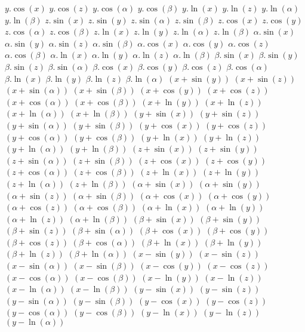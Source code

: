 $ y . \cos(x) $
$ y . \cos(z) $
$ y . \cos(\alpha) $
$ y . \cos(\beta) $
$ y . \ln(x) $
$ y . \ln(z) $
$ y . \ln(\alpha) $
$ y . \ln(\beta) $
$ z . \sin(x) $
$ z . \sin(y) $
$ z . \sin(\alpha) $
$ z . \sin(\beta) $
$ z . \cos(x) $
$ z . \cos(y) $
$ z . \cos(\alpha) $
$ z . \cos(\beta) $
$ z . \ln(x) $
$ z . \ln(y) $
$ z . \ln(\alpha) $
$ z . \ln(\beta) $
$ \alpha . \sin(x) $
$ \alpha . \sin(y) $
$ \alpha . \sin(z) $
$ \alpha . \sin(\beta) $
$ \alpha . \cos(x) $
$ \alpha . \cos(y) $
$ \alpha . \cos(z) $
$ \alpha . \cos(\beta) $
$ \alpha . \ln(x) $
$ \alpha . \ln(y) $
$ \alpha . \ln(z) $
$ \alpha . \ln(\beta) $
$ \beta . \sin(x) $
$ \beta . \sin(y) $
$ \beta . \sin(z) $
$ \beta . \sin(\alpha) $
$ \beta . \cos(x) $
$ \beta . \cos(y) $
$ \beta . \cos(z) $
$ \beta . \cos(\alpha) $
$ \beta . \ln(x) $
$ \beta . \ln(y) $
$ \beta . \ln(z) $
$ \beta . \ln(\alpha) $
$ (x + \sin(y)) $
$ (x + \sin(z)) $
$ (x + \sin(\alpha)) $
$ (x + \sin(\beta)) $
$ (x + \cos(y)) $
$ (x + \cos(z)) $
$ (x + \cos(\alpha)) $
$ (x + \cos(\beta)) $
$ (x + \ln(y)) $
$ (x + \ln(z)) $
$ (x + \ln(\alpha)) $
$ (x + \ln(\beta)) $
$ (y + \sin(x)) $
$ (y + \sin(z)) $
$ (y + \sin(\alpha)) $
$ (y + \sin(\beta)) $
$ (y + \cos(x)) $
$ (y + \cos(z)) $
$ (y + \cos(\alpha)) $
$ (y + \cos(\beta)) $
$ (y + \ln(x)) $
$ (y + \ln(z)) $
$ (y + \ln(\alpha)) $
$ (y + \ln(\beta)) $
$ (z + \sin(x)) $
$ (z + \sin(y)) $
$ (z + \sin(\alpha)) $
$ (z + \sin(\beta)) $
$ (z + \cos(x)) $
$ (z + \cos(y)) $
$ (z + \cos(\alpha)) $
$ (z + \cos(\beta)) $
$ (z + \ln(x)) $
$ (z + \ln(y)) $
$ (z + \ln(\alpha)) $
$ (z + \ln(\beta)) $
$ (\alpha + \sin(x)) $
$ (\alpha + \sin(y)) $
$ (\alpha + \sin(z)) $
$ (\alpha + \sin(\beta)) $
$ (\alpha + \cos(x)) $
$ (\alpha + \cos(y)) $
$ (\alpha + \cos(z)) $
$ (\alpha + \cos(\beta)) $
$ (\alpha + \ln(x)) $
$ (\alpha + \ln(y)) $
$ (\alpha + \ln(z)) $
$ (\alpha + \ln(\beta)) $
$ (\beta + \sin(x)) $
$ (\beta + \sin(y)) $
$ (\beta + \sin(z)) $
$ (\beta + \sin(\alpha)) $
$ (\beta + \cos(x)) $
$ (\beta + \cos(y)) $
$ (\beta + \cos(z)) $
$ (\beta + \cos(\alpha)) $
$ (\beta + \ln(x)) $
$ (\beta + \ln(y)) $
$ (\beta + \ln(z)) $
$ (\beta + \ln(\alpha)) $
$ (x - \sin(y)) $
$ (x - \sin(z)) $
$ (x - \sin(\alpha)) $
$ (x - \sin(\beta)) $
$ (x - \cos(y)) $
$ (x - \cos(z)) $
$ (x - \cos(\alpha)) $
$ (x - \cos(\beta)) $
$ (x - \ln(y)) $
$ (x - \ln(z)) $
$ (x - \ln(\alpha)) $
$ (x - \ln(\beta)) $
$ (y - \sin(x)) $
$ (y - \sin(z)) $
$ (y - \sin(\alpha)) $
$ (y - \sin(\beta)) $
$ (y - \cos(x)) $
$ (y - \cos(z)) $
$ (y - \cos(\alpha)) $
$ (y - \cos(\beta)) $
$ (y - \ln(x)) $
$ (y - \ln(z)) $
$ (y - \ln(\alpha)) $
